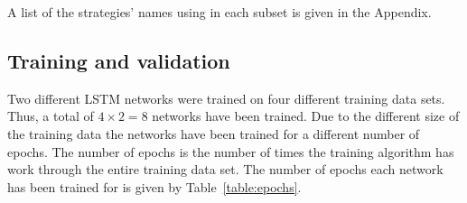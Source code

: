 \begin{table}[htb]
    \centering
    \caption{Training data sets used to training the LSTM networks. The IPD
    standard tournament with the 218 opponent has been carried out using APL version
    4.5.0. The results are available online:
    \url{https://github.com/Axelrod-Python/tournament}.}\label{table:training_data_sets}
\end{table}

A list of the strategies' names using in each subset is given in the Appendix. %

\subsection{Training and validation}

Two different LSTM networks were trained on four different training data sets.
Thus, a total of \(4 \times 2 = 8\) networks have been trained. Due to the
different size of the training data the networks have been trained for a
different number of epochs. The number of epochs is the number of times the
training algorithm has work through the entire training data set. The number of
epochs each network has been trained for is given by Table~\ref{table:epochs}.

